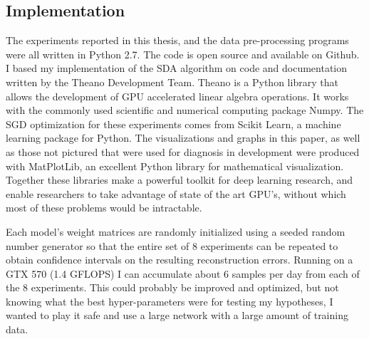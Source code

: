\documentclass[12pt]{article}
\begin{document}
\begin{doublespacing}
	\subsection{Implementation} 
	The experiments reported in this thesis, and the data pre-processing programs were all written in Python 2.7. The code is open source and available on Github\cite{nifong13}.  I based my implementation of the SDA algorithm on code and documentation written by the Theano Development Team. Theano is a Python library that allows the development of GPU accelerated linear algebra operations. It works with the commonly used scientific and numerical computing package Numpy. The SGD optimization for these experiments comes from Scikit Learn, a machine learning package for Python. The visualizations and graphs in this paper, as well as those not pictured that were used for diagnosis in development were produced with MatPlotLib, an excellent Python library for mathematical visualization. Together these libraries make a powerful toolkit for deep learning research, and enable researchers to take advantage of state of the art GPU's, without which most of these problems would be intractable. 
	
	Each model's weight matrices are randomly initialized using a seeded random number generator so that the entire set of 8 experiments can be repeated to obtain confidence intervals on the resulting reconstruction errors. Running on a GTX 570 (1.4 GFLOPS) I can accumulate about 6 samples per day from each of the 8 experiments. This could probably be improved and optimized, but not knowing what the best hyper-parameters were for testing my hypotheses, I wanted to play it safe and use a large network with a large amount of training data. 


\end{doublespacing}
\end{document}
